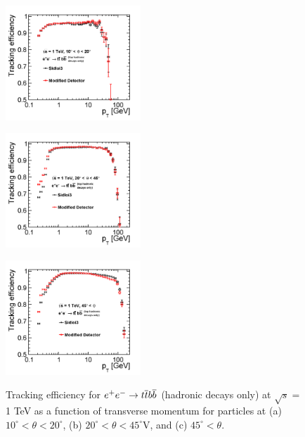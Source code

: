 \begin{figure}[h!]
\begin{minipage}{.33\textwidth}
\centering
\includegraphics[width=2.0in]{ttbb6qallEfficiencyPtLowTheta_sidloi3_det_vtxbar_3doublet.png}
\label{fig:ttbbeffptlowtheta}
\end{minipage}%
\begin{minipage}{.33\textwidth}
\centering
\includegraphics[width=2.0in]{ttbb6qallEfficiencyPtMedTheta_sidloi3_det_vtxbar_3doublet.png}
\label{fig:ttbbeffptmedtheta}
\end{minipage}
\begin{minipage}{.33\textwidth}
\centering
\includegraphics[width=2.0in]{ttbb6qallEfficiencyPtHighTheta_sidloi3_det_vtxbar_3doublet.png}
\label{fig:ttbbeffpthightheta}
\end{minipage}
\caption{Tracking efficiency for $\ee \rightarrow \ttbar \bbbar$ (hadronic decays only) at $ \sqrt{s} = $ 1 TeV as a function of transverse momentum
for particles at (a) $10^{\circ}< \theta < 20^{\circ}$, (b) $20^{\circ}< \theta < 45^{\circ}$V, and (c) $45^{\circ}< \theta$.}
\label{fig:ttbbeffpt}
\end{figure}

